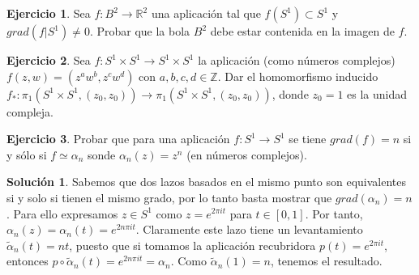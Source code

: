 \documentclass{article}
\theoremstyle{plain}
\theoremstyle{definition}
\newtheorem{exercise}{Ejercicio}
\newtheorem*{sol*}{Solución}
\begin{document}
\newpage

\begin{exercise}
Sea $f:B^2 \to \mathbb{R}^2$ una aplicaci\'on tal que $f(S^1) \subset S^1$ y
$grad (f|S^1)\neq 0$. Probar que la bola $B^2$ debe estar contenida en la imagen de $f$.
\end{exercise}

\newpage

\begin{exercise}
\item \label{pl11.n1}
Sea $f:S^1\times S^1 \to S^1 \times S^1$ la aplicaci\'on (como n\'umeros complejos) $f(z,w)=(z^a
w^b,z^c w^d)$ con $a,b,c,d \in \mathbb{Z}$. Dar el homomorfismo inducido
$f_*: \pi_1(S^1\times S^1,(z_0,z_0)) \to \pi_1(S^1\times S^1,(z_0,z_0))$, donde $z_0 = 1$ es la unidad compleja.
\end{exercise}

\newpage

\begin{exercise}
Probar que para una aplicaci\'on $f: S^1\to S^1$ se tiene $grad(f) = n$ si y s\'olo si $f\simeq \alpha_n$ sonde
$\alpha_n(z) = z^n$ (en n\'umeros complejos).
\end{exercise}
\begin{sol*}
Sabemos que dos lazos basados en el mismo punto son equivalentes si y solo si tienen el mismo grado, por lo tanto basta mostrar que $grad(\alpha_n)=n$. Para ello expresamos $z\in S^1$ como $z=e^{2\pi it}$ para $t\in[0,1]$. Por tanto, $\alpha_n(z)=\alpha_n(t)=e^{2n\pi i t}$. Claramente este lazo tiene un levantamiento $\tilde{\alpha}_n(t)=nt$, puesto que si tomamos la aplicación recubridora $p(t)=e^{2\pi it}$, entonces $p\circ\tilde{\alpha}_n(t)=e^{2n\pi it}=\alpha_n$. Como $\tilde{\alpha}_n(1)=n$, tenemos el resultado.
\end{sol*}
\newpage
\end{document}
